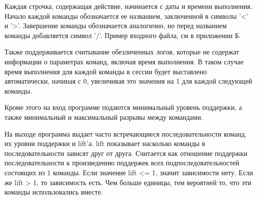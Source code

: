 
Каждая строчка, содержащая действие, начинается с даты и времени выполнения. Начало каждой команды обозначается ее названием, заключенной в символы '<' и '>'. Завершение команды обозначается аналогично, но перед названием команды добавляется символ '/'. Пример входного файла, см в приложении Б. 

Также поддерживается считывание обезличенных логов, которые не содержат информации о параметрах команд, включая время выполнения. В таком случае время выполнения для каждой команды в сессии будет выставлено автоматически, начиная с 0, увеличивая это значения на 1 для каждой следующей команды.

Кроме этого на вход программе подаются минимальный уровень поддержки, а также минимальный и максимальный разрывы между командами.

На выходе программа выдает часто встречающиеся последовательности команд, их уровни поддержки и lift'а.
lift показывает насколько команды в последовательности зависят друг от друга. 
Считается как отношение поддержки последовательности к произведению поддержек всех подпоследовательностей состоящих из 1 команды. Если значение lift <= 1, значит зависимости нету. Если же lift > 1, то зависимость есть. Чем больше единицы, тем вероятней то, что эти команды использовались вместе.

